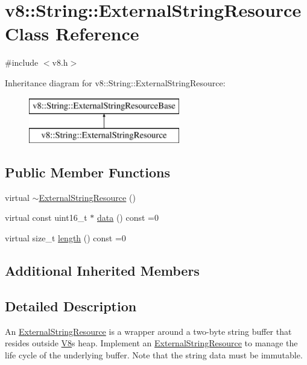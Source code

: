 \hypertarget{classv8_1_1_string_1_1_external_string_resource}{}\section{v8\+:\+:String\+:\+:External\+String\+Resource Class Reference}
\label{classv8_1_1_string_1_1_external_string_resource}


{\ttfamily \#include $<$v8.\+h$>$}

Inheritance diagram for v8\+:\+:String\+:\+:External\+String\+Resource\+:\begin{figure}[H]
\begin{center}
\leavevmode
\includegraphics[height=2.000000cm]{classv8_1_1_string_1_1_external_string_resource}
\end{center}
\end{figure}
\subsection*{Public Member Functions}
\begin{DoxyCompactItemize}
\item 
virtual \hyperlink{classv8_1_1_string_1_1_external_string_resource_a6b7ef9e33a47059092e1447b10c35416}{$\sim$\+External\+String\+Resource} ()
\item 
virtual const uint16\+\_\+t $\ast$ \hyperlink{classv8_1_1_string_1_1_external_string_resource_a987309199b848511adb708e221e0fb0a}{data} () const =0
\item 
virtual size\+\_\+t \hyperlink{classv8_1_1_string_1_1_external_string_resource_ab5ca300fea077d7c7774ec49d32e4da1}{length} () const =0
\end{DoxyCompactItemize}
\subsection*{Additional Inherited Members}


\subsection{Detailed Description}
An \hyperlink{classv8_1_1_string_1_1_external_string_resource}{External\+String\+Resource} is a wrapper around a two-\/byte string buffer that resides outside \hyperlink{classv8_1_1_v8}{V8}\textquotesingle{}s heap. Implement an \hyperlink{classv8_1_1_string_1_1_external_string_resource}{External\+String\+Resource} to manage the life cycle of the underlying buffer. Note that the string data must be immutable. 

